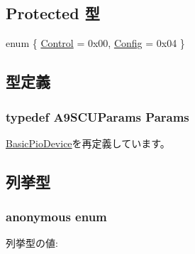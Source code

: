 \subsection*{Protected 型}
\begin{DoxyCompactItemize}
\item 
enum \{ \hyperlink{classA9SCU_a394b3903fbf00ba2b6243f60689a5a5fa472675dc9774d12a861cde09d5f590e2}{Control} =  0x00, 
\hyperlink{classA9SCU_a394b3903fbf00ba2b6243f60689a5a5fa5c9e6911f4248ff02074469a6b247156}{Config} =  0x04
 \}
\end{DoxyCompactItemize}


\subsection{型定義}
\hypertarget{classA9SCU_a6264a26c977c4e8d51cb6b3d6cd3a842}{
\subsubsection[{Params}]{\setlength{\rightskip}{0pt plus 5cm}typedef A9SCUParams {\bf Params}}}
\label{classA9SCU_a6264a26c977c4e8d51cb6b3d6cd3a842}


\hyperlink{classBasicPioDevice_a2845515ac6467f10540747053c8a0449}{BasicPioDevice}を再定義しています。

\subsection{列挙型}
\hypertarget{classA9SCU_a394b3903fbf00ba2b6243f60689a5a5f}{
\subsubsection[{"@42}]{\setlength{\rightskip}{0pt plus 5cm}anonymous enum}}
\label{classA9SCU_a394b3903fbf00ba2b6243f60689a5a5f}
\begin{Desc}
\item[列挙型の値: ]\par
\begin{description}
\item[{\em 
\hypertarget{classA9SCU_a394b3903fbf00ba2b6243f60689a5a5fa472675dc9774d12a861cde09d5f590e2}{
Control}
\label{classA9SCU_a394b3903fbf00ba2b6243f60689a5a5fa472675dc9774d12a861cde09d5f590e2}
}]\item[{\em 
\hypertarget{classA9SCU_a394b3903fbf00ba2b6243f60689a5a5fa5c9e6911f4248ff02074469a6b247156}{
Config}
\label{classA9SCU_a394b3903fbf00ba2b6243f60689a5a5fa5c9e6911f4248ff02074469a6b247156}
}]\end{description}
\end{Desc}




